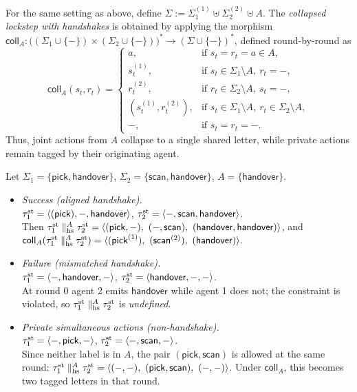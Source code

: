 \documentclass{article}
\begin{document}
  
  \begin{definition}
  For the same setting as above, define 
  \(\Sigma:=\Sigma_1^{(1)}\uplus\Sigma_2^{(2)}\uplus A\).  
  The \emph{collapsed lockstep with handshakes} is obtained by applying the morphism \(\mathsf{coll}_A:\big((\Sigma_1\cup\{-\})\times(\Sigma_2\cup\{-\})\big)^{*}\to(\Sigma\cup\{-\})^{*}\), 
  defined round-by-round as
  \[
  \mathsf{coll}_A(s_t,r_t)=
  \begin{cases}
  a, & \text{if } s_t=r_t=a\in A,\\
  s_t^{(1)}, & \text{if } s_t\in\Sigma_1\setminus A,\ r_t=-,\\
  r_t^{(2)}, & \text{if } r_t\in\Sigma_2\setminus A,\ s_t=-,\\
  (s_t^{(1)},r_t^{(2)}), & \text{if } s_t\in\Sigma_1\setminus A,\ r_t\in\Sigma_2\setminus A,\\
  -, & \text{if } s_t=r_t=-.
  \end{cases}
  \]
  Thus, joint actions from $A$ collapse to a single shared letter, while private actions remain tagged by their originating agent.
  \end{definition}
  \begin{example}
  Let \(\Sigma_1=\{\textsf{pick},\textsf{handover}\}\),
  \(\Sigma_2=\{\textsf{scan},\textsf{handover}\}\),
  \(A=\{\textsf{handover}\}\).
  \begin{itemize}
    \item \emph{Success (aligned handshake).}\\
    \(\tau^{\mathrm{st}}_1=\langle (\textsf{pick}),- ,\textsf{handover} \rangle \),\quad
    \(\tau^{\mathrm{st}}_2=\langle - ,\textsf{scan},\textsf{handover} \rangle \).\\
    Then
    \(
    \taust_1 \parallel_{\mathrm{hs}}^{A} \taust_2
    =\trace{(\textsf{pick},-),\ (-,\textsf{scan}),\ (\textsf{handover},\textsf{handover})}
    \),
    and\\
    \(
    \mathsf{coll}_A(\taust_1 \parallel_{\mathrm{hs}}^{A} \taust_2)
    =\trace{(\textsf{pick}^{(1)}),\ (\textsf{scan}^{(2)}),\ (\textsf{handover})}.
    \)
    \item \emph{Failure (mismatched handshake).}\\
    \(\tau^{\mathrm{st}}_1=\langle - ,\textsf{handover},- \rangle \),\quad
    \(\tau^{\mathrm{st}}_2=\langle \textsf{handover},- ,- \rangle \).\\
    At round \(0\) agent 2 emits \(\textsf{handover}\) while agent 1 does not; the constraint is violated, so
    \(\tau^{\mathrm{st}}_1 \parallel_{\mathrm{hs}}^{A} \tau^{\mathrm{st}}_2\) is \emph{undefined}.
    \item \emph{Private simultaneous actions (non-handshake).}\\
    \(\tau^{\mathrm{st}}_1=\langle - ,\textsf{pick},- \rangle \),\quad
    \(\tau^{\mathrm{st}}_2=\langle - ,\textsf{scan},- \rangle \).\\
    Since neither label is in \(A\), the pair \((\textsf{pick},\textsf{scan})\) is allowed at the same round:
    \(\tau^{\mathrm{st}}_1 \parallel_{\mathrm{hs}}^{A} \tau^{\mathrm{st}}_2
     = \langle (-,-),\ (\textsf{pick},\textsf{scan}),\ (-,-) \rangle \).
    Under \(\mathsf{coll}_A\), this becomes two tagged letters in that round.
  \end{itemize}
  \end{example}
  
\end{document}
